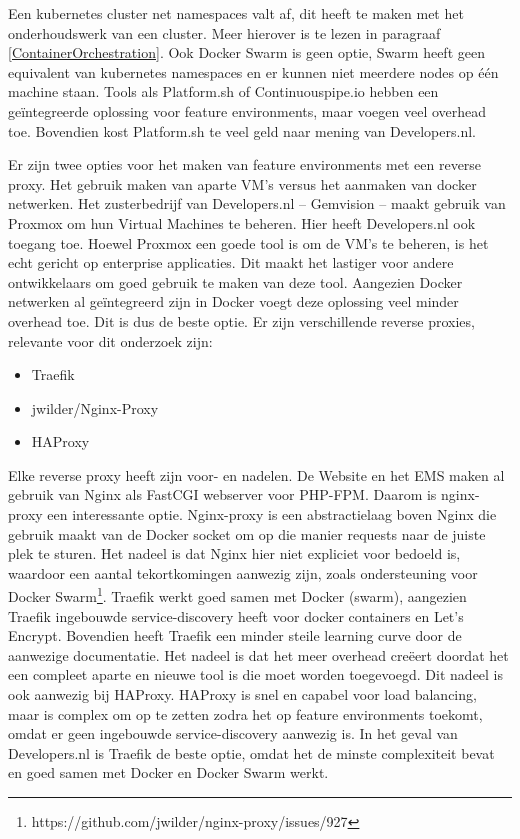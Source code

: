 Een kubernetes cluster net namespaces valt af, dit heeft te maken met het onderhoudswerk van een cluster. Meer hierover is te lezen in paragraaf \ref{ContainerOrchestration}. Ook Docker Swarm is geen optie, Swarm heeft geen equivalent van kubernetes namespaces en er kunnen niet meerdere nodes op één machine staan. Tools als Platform.sh of Continuouspipe.io hebben een geïntegreerde oplossing voor feature environments, maar voegen veel overhead toe. Bovendien kost Platform.sh te veel geld naar mening van Developers.nl.

Er zijn twee opties voor het maken van feature environments met een reverse proxy. Het gebruik maken van aparte VM's versus het aanmaken van docker netwerken. Het zusterbedrijf van Developers.nl -- Gemvision -- maakt gebruik van Proxmox om hun Virtual Machines te beheren. Hier heeft Developers.nl ook toegang toe. Hoewel Proxmox een goede tool is om de VM's te beheren, is het echt gericht op enterprise applicaties. Dit maakt het lastiger voor andere ontwikkelaars om goed gebruik te maken van deze tool. Aangezien Docker netwerken al geïntegreerd zijn in Docker voegt deze oplossing veel minder overhead toe. Dit is dus de beste optie. Er zijn verschillende reverse proxies, relevante voor dit onderzoek zijn:
\begin{itemize}
	\item Traefik
	\item jwilder/Nginx-Proxy
	\item HAProxy	
\end{itemize}

Elke reverse proxy heeft zijn voor- en nadelen. De Website en het EMS maken al gebruik van Nginx als FastCGI webserver voor PHP-FPM. Daarom is nginx-proxy een interessante optie. Nginx-proxy is een abstractielaag boven Nginx die gebruik maakt van de Docker socket om op die manier requests naar de juiste plek te sturen. Het nadeel is dat Nginx hier niet expliciet voor bedoeld is, waardoor een aantal tekortkomingen aanwezig zijn, zoals ondersteuning voor Docker Swarm\footnote{https://github.com/jwilder/nginx-proxy/issues/927}. Traefik werkt goed samen met Docker (swarm), aangezien Traefik ingebouwde service-discovery heeft voor docker containers en Let's Encrypt. Bovendien heeft Traefik een minder steile learning curve door de aanwezige documentatie. Het nadeel is dat het meer overhead creëert doordat het een compleet aparte en nieuwe tool is die moet worden toegevoegd. Dit nadeel is ook aanwezig bij HAProxy. HAProxy is snel en capabel voor load balancing, maar is complex om op te zetten zodra het op feature environments toekomt, omdat er geen ingebouwde service-discovery aanwezig is.  In het geval van Developers.nl is Traefik de beste optie, omdat het de minste complexiteit bevat en goed samen met Docker en Docker Swarm werkt. 

